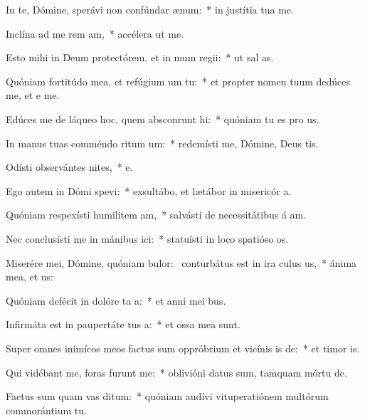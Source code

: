\item In te, Dómine, sperávi non confúndar  ænum:~* in justítia tua  me.
\item Inclína ad me rem am,~* accélera ut  me.
\item Esto mihi in Deum protectórem, et in mum regii:~* ut sal  as.
\item Quóniam fortitúdo mea, et refúgium um  tu:~* et propter nomen tuum dedúces me, et e me.
\item Edúces me de láqueo hoc, quem absconrunt hi:~* quóniam tu es pro us.
\item In manus tuas comméndo ritum um:~* redemísti me, Dómine, Deus tis.
\item Odísti observántes nites,~* e.
\item Ego autem in Dómi spevi:~* exsultábo, et lætábor in misericór a.
\item Quóniam respexísti humilitem am,~* salvásti de necessitátibus á am.
\item Nec conclusísti me in mánibus ici:~* statuísti in loco spatióso  os.
\item Miserére mei, Dómine, quóniam bulor:~\pscross{} conturbátus est in ira culus us,~* ánima mea, et  us:
\item Quóniam defécit in dolóre ta a:~* et anni mei  bus.
\item Infirmáta est in paupertáte tus a:~* et ossa mea  sunt.
\item Super omnes inimícos meos factus sum oppróbrium et vicínis is de:~* et timor  is.
\item Qui vidébant me, foras furunt  me:~* oblivióni datus sum, tamquam mórtu  de.
\item Factus sum quam vas ditum:~* quóniam audívi vituperatiónem multórum commorántium  tu.
